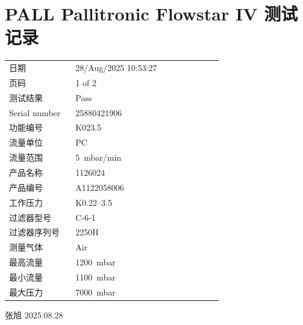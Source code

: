 \documentclass[UTF8,10pt,a4paper,fontset=fandol]{ctexart}
\newcommand{\fieldvalue}[1]{#1}
\newcommand{\handwritten}[1]{#1}
\begin{document}
\newpage

\section*{PALL Pallitronic Flowstar IV 测试记录}

\begin{tabular}{@{}p{0.28\linewidth}p{0.62\linewidth}@{}}
日期 &
\fieldvalue{28/Aug/2025 10:53:27}
\\
页码 & 1 of 2 \\
测试结果 &
\fieldvalue{Pass}
\\
Serial number &
\fieldvalue{25880421906}
\\
功能编号 &
\fieldvalue{K023.5}
\\
流量单位 &
\fieldvalue{PC}
\\
流量范围 &
\fieldvalue{5~mbar/min}
\\
产品名称 &
\fieldvalue{1126024}
\\
产品编号 &
\fieldvalue{A1122058006}
\\
工作压力 &
\fieldvalue{K0.22--3.5}
\\
过滤器型号 &
\fieldvalue{C-6-1}
\\
过滤器序列号 &
\fieldvalue{2250H}
\\
测量气体 &
\fieldvalue{Air}
\\
最高流量 &
\fieldvalue{1200~mbar}
\\
最小流量 &
\fieldvalue{1100~mbar}
\\
最大压力 &
\fieldvalue{7000~mbar}
\\
\end{tabular}

\vspace{1em}
\noindent
\fieldvalue{\handwritten{张旭 2025.08.28}}
\end{document}
